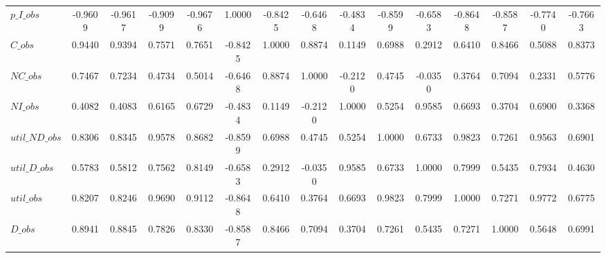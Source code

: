 \begin{center}
\begin{longtable}{lcccccccccccccc}
$p\_I\_obs      $	 & 	          -0.9609	 & 	          -0.9617	 & 	          -0.9099	 & 	          -0.9676	 & 	           1.0000	 & 	          -0.8425	 & 	          -0.6468	 & 	          -0.4834	 & 	          -0.8599	 & 	          -0.6583	 & 	          -0.8648	 & 	          -0.8587	 & 	          -0.7740	 & 	          -0.7663 \\ 
$C\_obs         $	 & 	           0.9440	 & 	           0.9394	 & 	           0.7571	 & 	           0.7651	 & 	          -0.8425	 & 	           1.0000	 & 	           0.8874	 & 	           0.1149	 & 	           0.6988	 & 	           0.2912	 & 	           0.6410	 & 	           0.8466	 & 	           0.5088	 & 	           0.8373 \\ 
$NC\_obs        $	 & 	           0.7467	 & 	           0.7234	 & 	           0.4734	 & 	           0.5014	 & 	          -0.6468	 & 	           0.8874	 & 	           1.0000	 & 	          -0.2120	 & 	           0.4745	 & 	          -0.0350	 & 	           0.3764	 & 	           0.7094	 & 	           0.2331	 & 	           0.5776 \\ 
$NI\_obs        $	 & 	           0.4082	 & 	           0.4083	 & 	           0.6165	 & 	           0.6729	 & 	          -0.4834	 & 	           0.1149	 & 	          -0.2120	 & 	           1.0000	 & 	           0.5254	 & 	           0.9585	 & 	           0.6693	 & 	           0.3704	 & 	           0.6900	 & 	           0.3368 \\ 
$util\_ND\_obs  $	 & 	           0.8306	 & 	           0.8345	 & 	           0.9578	 & 	           0.8682	 & 	          -0.8599	 & 	           0.6988	 & 	           0.4745	 & 	           0.5254	 & 	           1.0000	 & 	           0.6733	 & 	           0.9823	 & 	           0.7261	 & 	           0.9563	 & 	           0.6901 \\ 
$util\_D\_obs   $	 & 	           0.5783	 & 	           0.5812	 & 	           0.7562	 & 	           0.8149	 & 	          -0.6583	 & 	           0.2912	 & 	          -0.0350	 & 	           0.9585	 & 	           0.6733	 & 	           1.0000	 & 	           0.7999	 & 	           0.5435	 & 	           0.7934	 & 	           0.4630 \\ 
$util\_obs      $	 & 	           0.8207	 & 	           0.8246	 & 	           0.9690	 & 	           0.9112	 & 	          -0.8648	 & 	           0.6410	 & 	           0.3764	 & 	           0.6693	 & 	           0.9823	 & 	           0.7999	 & 	           1.0000	 & 	           0.7271	 & 	           0.9772	 & 	           0.6775 \\ 
$D\_obs         $	 & 	           0.8941	 & 	           0.8845	 & 	           0.7826	 & 	           0.8330	 & 	          -0.8587	 & 	           0.8466	 & 	           0.7094	 & 	           0.3704	 & 	           0.7261	 & 	           0.5435	 & 	           0.7271	 & 	           1.0000	 & 	           0.5648	 & 	           0.6991 \\ 

\end{longtable}
\end{center}
